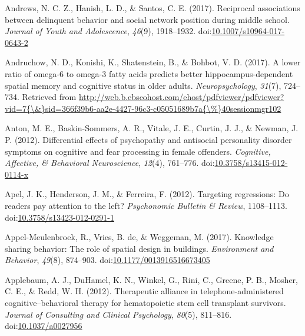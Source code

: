 \documentclass[english,man]{apa6}
\theoremstyle{definition}
\theoremstyle{definition}
\theoremstyle{definition}
\theoremstyle{remark}
\begin{document}
\hypertarget{ref-Andrews2017}{}
Andrews, N. C. Z., Hanish, L. D., \& Santos, C. E. (2017). Reciprocal
associations between delinquent behavior and social network position
during middle school. \emph{Journal of Youth and Adolescence},
\emph{46}(9), 1918--1932.
doi:\href{https://doi.org/10.1007/s10964-017-0643-2}{10.1007/s10964-017-0643-2}

\hypertarget{ref-Andruchow2017}{}
Andruchow, N. D., Konishi, K., Shatenstein, B., \& Bohbot, V. D. (2017).
A lower ratio of omega-6 to omega-3 fatty acids predicts better
hippocampus-dependent spatial memory and cognitive status in older
adults. \emph{Neuropsychology}, \emph{31}(7), 724--734. Retrieved from
\href{http://web.b.ebscohost.com/ehost/pdfviewer/pdfviewer?vid=7\%7B/\&\%7Dsid=366f39b6-aa2e-4427-96c3-c05051689b7a\%7B/\%\%7D40sessionmgr102}{http://web.b.ebscohost.com/ehost/pdfviewer/pdfviewer?vid=7\{\textbackslash{}\&\}sid=366f39b6-aa2e-4427-96c3-c05051689b7a\{\textbackslash{}\%\}40sessionmgr102}

\hypertarget{ref-Anton2012}{}
Anton, M. E., Baskin-Sommers, A. R., Vitale, J. E., Curtin, J. J., \&
Newman, J. P. (2012). Differential effects of psychopathy and antisocial
personality disorder symptoms on cognitive and fear processing in female
offenders. \emph{Cognitive, Affective, \& Behavioral Neuroscience},
\emph{12}(4), 761--776.
doi:\href{https://doi.org/10.3758/s13415-012-0114-x}{10.3758/s13415-012-0114-x}

\hypertarget{ref-Apel2012}{}
Apel, J. K., Henderson, J. M., \& Ferreira, F. (2012). Targeting
regressions: Do readers pay attention to the left? \emph{Psychonomic
Bulletin \& Review}, 1108--1113.
doi:\href{https://doi.org/10.3758/s13423-012-0291-1}{10.3758/s13423-012-0291-1}

\hypertarget{ref-Appel-Meulenbroek2017}{}
Appel-Meulenbroek, R., Vries, B. de, \& Weggeman, M. (2017). Knowledge
sharing behavior: The role of spatial design in buildings.
\emph{Environment and Behavior}, \emph{49}(8), 874--903.
doi:\href{https://doi.org/10.1177/0013916516673405}{10.1177/0013916516673405}

\hypertarget{ref-Applebaum2012}{}
Applebaum, A. J., DuHamel, K. N., Winkel, G., Rini, C., Greene, P. B.,
Mosher, C. E., \& Redd, W. H. (2012). Therapeutic alliance in
telephone-administered cognitive--behavioral therapy for hematopoietic
stem cell transplant survivors. \emph{Journal of Consulting and Clinical
Psychology}, \emph{80}(5), 811--816.
doi:\href{https://doi.org/10.1037/a0027956}{10.1037/a0027956}
\end{document}
